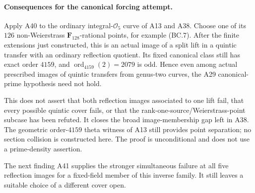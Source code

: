\paragraph{Consequences for the canonical forcing attempt.}
Apply A40 to the ordinary integral-$\mathcal O_5$ curve of
A13 and A38. Choose one of its $126$ non-Weierstrass
$\mathbf F_{128}$-rational points, for example (BC.7).
After the finite extensions just constructed, this is an
actual image of a split lift in a quintic transfer with an
ordinary reflection quotient. Its fixed canonical class
still has exact order $4159$, and
$\operatorname{ord}_{4159}(2)=2079$ is odd. Hence even among
actual prescribed images of quintic transfers from genus-two
curves, the A29 canonical-prime hypothesis need not hold.

This does not assert that both reflection images associated
to one lift fail, that every possible quintic cover fails,
or that the rank-one-source/Weierstrass-point subcase has
been refuted. It closes the broad image-membership gap left
in A38. The geometric order-$4159$ theta witness of A13
still provides point separation; no section collision is
constructed here. The proof is unconditional and does not
use a prime-density assertion.

The next finding A41 supplies the stronger simultaneous failure at all
five reflection images for a fixed-field member of this inverse family.
It still leaves a suitable choice of a different cover open.
